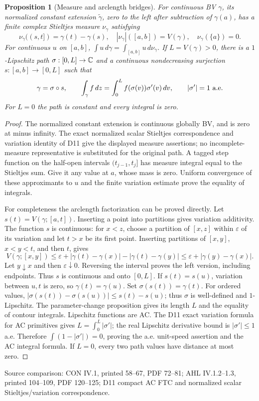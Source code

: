 \documentclass[11pt,a4paper,openany]{book}
\newtheorem{proposition}[theorem]{Proposition}
\theoremstyle{definition}
\theoremstyle{remark}\newtheorem{remark}[theorem]{Remark}
\newcommand{\eps}{\varepsilon}\newcommand{\ee}{\varepsilon}
\newcommand{\dd}{\,d}\newcommand{\iu}{\mathrm i}
\newcommand{\source}[1]{\par\begingroup\small\sffamily\color{black!65}Source comparison: #1\par\endgroup}
\begin{document}
\begin{proposition}[Measure and arclength bridges]\label{d12:03-06-measure-arclength}
For continuous BV \(\gamma\), its normalized constant extension
\(\widetilde\gamma\), zero to the left after subtraction of \(\gamma(a)\),
has a finite complex Stieltjes measure \(\nu_\gamma\) satisfying
\[
 \nu_\gamma((s,t])=\gamma(t)-\gamma(s),\quad
 |\nu_\gamma|([a,b])=V(\gamma),\quad \nu_\gamma(\{a\})=0.
\]
For continuous \(u\) on \([a,b]\),
\(\int u\dd\gamma=\int_{[a,b]}u\dd\nu_\gamma\).
If \(L=V(\gamma)>0\), there is a \(1\)-Lipschitz path
\(\sigma:[0,L]\to\mathbb C\) and a continuous nondecreasing surjection
\(s:[a,b]\to[0,L]\) such that
\[
 \gamma=\sigma\circ s,\qquad
 \int_\gamma f\dd z=\int_0^L f(\sigma(v))\sigma'(v)\dd v,\qquad
 |\sigma'|=1\ \hbox{a.e.}
\]
For \(L=0\) the path is constant and every integral is zero.
\end{proposition}
\begin{proof}
The normalized constant extension is continuous globally BV, and is zero
at minus infinity. The exact normalized scalar Stieltjes correspondence
and variation identity of D11 give the displayed measure assertions;
no incomplete-measure representative is substituted for the original path.
A tagged step function on the half-open intervals \((t_{j-1},t_j]\)
has measure integral equal to the Stieltjes sum. Give it any value at
\(a\), whose mass is zero. Uniform convergence of these approximants
to \(u\) and the finite variation estimate prove the equality of integrals.

For completeness the arclength factorization can be proved directly.
Let \(s(t)=V(\gamma;[a,t])\). Inserting a point into partitions gives
variation additivity. The function \(s\) is continuous: for \(x<z\),
choose a partition of \([x,z]\) within \(\eps\) of its variation and let
\(t>x\) be its first point. Inserting partitions of \([x,y]\), \(x<y<t\),
and then \(t\), gives
\[
 V(\gamma;[x,y])\le\eps+
 |\gamma(t)-\gamma(x)|-|\gamma(t)-\gamma(y)|
 \le\eps+|\gamma(y)-\gamma(x)|.
\]
Let \(y\downarrow x\) and then \(\eps\downarrow0\).
Reversing the interval proves the left version, including endpoints.
Thus \(s\) is continuous and onto \([0,L]\).
If \(s(t)=s(u)\), variation between \(u,t\) is zero, so
\(\gamma(t)=\gamma(u)\). Set \(\sigma(s(t))=\gamma(t)\).
For ordered values,
\(|\sigma(s(t))-\sigma(s(u))|\le s(t)-s(u)\); thus \(\sigma\) is
well-defined and \(1\)-Lipschitz. The parameter-change proposition gives
its length \(L\) and the equality of contour integrals.
Lipschitz functions are AC. The D11 exact variation formula for AC
primitives gives \(L=\int_0^L|\sigma'|\); the real Lipschitz derivative
bound is \(|\sigma'|\le1\) a.e. Therefore
\(\int(1-|\sigma'|)=0\), proving the a.e. unit-speed assertion and
the AC integral formula. If \(L=0\), every two path values have distance
at most zero.
\end{proof}
\source{CON IV.1, printed 58--67, PDF 72--81; AHL IV.1.2--1.3, printed 104--109, PDF 120--125; D11 compact AC FTC and normalized scalar Stieltjes/variation correspondence.}
\end{document}
